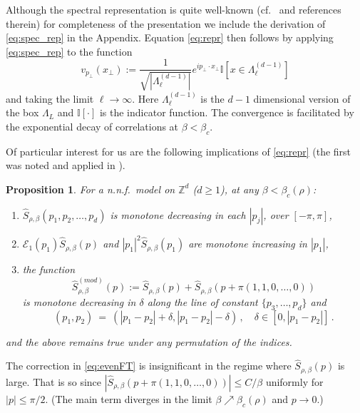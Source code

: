 \documentclass[a4paper,oneside,11pt]{article}
\def\Z{\mathbb{Z}}                          %
\newtheorem{proposition}[theorem]{Proposition}
\newcommand{\be}[1]{\begin{equation}\label{#1}}
\newcommand{\ee}{\end{equation}}
\numberwithin{equation}{section}
\numberwithin{equation}{section}
\numberwithin{equation}{section}
\newcommand{\calE}{\mathcal{E}}
\def\Z{\mathbb{Z}}                          %
\def\be{\begin{equation}}
\def\ee{\end{equation}}
\begin{document}
Although the spectral representation is quite well-known (cf.~\cite{GliJaf73} and references therein)  for completeness of the presentation we include the derivation of \eqref{eq:spec_rep} in the Appendix.      
Equation \eqref{eq:repr} then follows by applying \eqref{eq:spec_rep} to   the function 
$$ v_{p_\perp}(x_\perp):=  
\frac{1}{\sqrt{|\Lambda^{(d-1)}_\ell|}} e^{ip_\perp \cdot x_\perp} \mathbb I\left[ x\in \Lambda_\ell^{(d-1)}\right]$$
and taking the limit $\ell\to \infty$.  Here  $\Lambda^{(d-1)}_\ell$ is the $d-1$ dimensional version of the box $\Lambda_L$ and 
$\mathbb I [\cdot]$ is the indicator function.   The convergence is facilitated by the exponential decay of correlations at  $\beta <\beta_c$. 

Of particular interest for us are the following implications of \eqref{eq:repr} (the  first  was noted and applied  in \cite{GliJaf73}). 

 \begin{proposition}\label{cor:mono}
For {a n.n.f.~model} on $\Z^d$ ($d\ge1$), at any $\beta < \beta_c(\rho)$: 
 \begin{enumerate}[noitemsep]
\item  $\widehat S_{\rho,\beta}(p_1,p_2,\dots,p_d)$ is monotone decreasing in each $|p_j|$, over $[-\pi,\pi]$,  
\item $\calE_1(p_1)\widehat S_{\rho,\beta}(p)$ and $|p_1|^2\widehat S_{\rho,\beta}(p_1)$ 
are monotone increasing in  $|p_1|$, 
\item   the function 
\be \label{eq:evenFT}  
\widehat S^{(mod)}_{\rho,\beta}(p) := \widehat S_{\rho,\beta}(p)+\widehat S_{\rho,\beta}(p+\pi(1,1,0,\dots,0))
\ee  is monotone decreasing in $\delta$ along the line of constant $ \{p_3,\dots,p_d\} $  and  
 \be   
 (p_1,p_2) \ =\    (|p_1-p_2|+\delta,|p_1-p_2|-\delta)  \,,  \quad \delta \in [0, |{p_1-p_2}|] \,. 
  \ee    
\end{enumerate}
and the above remains  true under any permutation of the indices. 
 \end{proposition}
 
 The correction in \eqref{eq:evenFT} is insignificant in the regime where  $\widehat S_{\rho,\beta}(p) $ is large.  That is so since  $|\widehat S_{\rho,\beta}(p+\pi(1,1,0,\dots,0))| \leq  C/\beta$  
uniformly for  $|p| \leq \pi/2$. (The main term diverges in the limit  $\beta \nearrow \beta_c(\rho)$ and $p\to 0$.)
 
\end{document}
